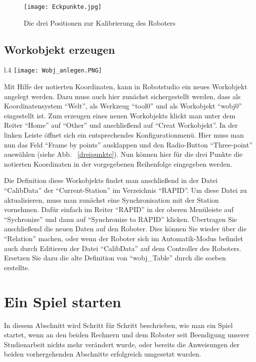 \begin{figure}[htbp]
\centering
\texttt{[image: Eckpunkte.jpg]}
\caption{Die drei Positionen zur Kalibrierung des Roboters} 
\label{eckpunkte}
\end{figure}

\subsection{Workobjekt erzeugen}

\begin{wrapfigure}{l}{.4\textwidth}
\centering
\texttt{[image: Wobj\_anlegen.PNG]}
\vspace{-15pt}
\caption{Workobjekt über drei Punkte definieren} 
\label{dreipunkte}
\end{wrapfigure}

Mit Hilfe der notierten Koordinaten, kann in Robotstudio ein neues Workobjekt angelegt werden. Dazu muss auch hier zunächst sichergestellt werden, dass als Koordinatensystem \enquote{Welt}, als Werkzeug \enquote{tool0} und als Workobjekt \enquote{wobj0} eingestellt ist. Zum erzeugen eines neuen Workobjekts klickt man unter dem Reiter \enquote{Home} auf \enquote{Other} und anschließend auf \enquote{Creat Workobjekt}. In der linken Leiste öffnet sich ein entsprechendes Konfigurationmenü. Hier muss man nun das Feld \enquote{Frame by points} ausklappen und den Radio-Button \enquote{Three-point} auswählen (siehe Abb. ~\ref{dreipunkte}). Nun können hier für die drei Punkte die notierten Koordinaten  in der vorgegebenen Reihenfolge eingegeben werden.  

Die Definition diese Workobjekts findet man anschließend in der Datei \enquote{CalibData} der \enquote{Current-Station} im Verzeichnis \enquote{RAPID}. Um diese Datei zu aktualisieren, muss man zunächst eine Synchronisation mit der Station vornehmen. Dafür einfach im Reiter \enquote{RAPID} in der oberen Menüleiste auf \enquote{Sychronize} und dann auf \enquote{Synchronize to RAPID} klicken. 
Übertragen Sie anschließend die neuen Daten auf den Roboter. Dies können Sie wieder über die \enquote{Relation} machen, oder wenn der Roboter sich im Automatik-Modus befindet auch durch Editieren der Datei \enquote{CalibData} auf dem Controller des Roboters. 
Ersetzen Sie dazu die alte Definition von \enquote{wobj\_Table} durch die soeben erstellte. 

\section{Ein Spiel starten}
\label{starten}
In diesem Abschnitt wird Schritt für Schritt beschrieben, wie man ein Spiel startet, wenn an den beiden Rechnern und dem Roboter seit Beendigung unserer Studienarbeit nichts mehr verändert wurde, oder bereits die Anweisungen der beiden vorhergehenden Abschnitte erfolgreich umgesetzt wurden.

